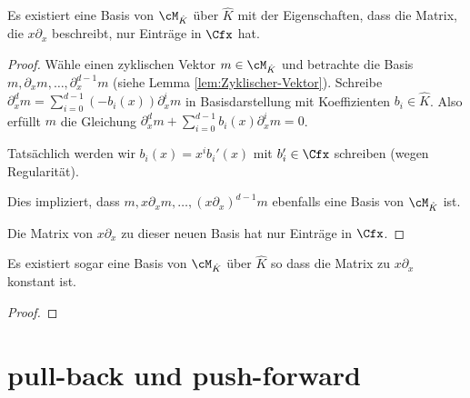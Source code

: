 \begin{lem}
\cite[Lem 5.2.1.]{sabbah_cimpa90}
Es existiert eine Basis von $\cM_{\hat K}$ über $\hat K$ mit der Eigenschaften,
dass die Matrix, die $x\partial_x$ beschreibt, nur Einträge in $\Cfx$ hat.
\end{lem}
\begin{proof}
Wähle einen zyklischen Vektor $m\in\cM_{\hat K}$ %
 und betrachte die Basis $m,\partial_x m,\dots,\partial_x^{d-1}m$ (siehe Lemma
\ref{lem:Zyklischer-Vektor}).
Schreibe $\partial_x^dm=\sum_{i=0}^{d-1}(-b_i(x))\partial_x^im$ in
Basisdarstellung mit Koeffizienten $b_i\in\hat K$.
Also erfüllt $m$ die Gleichung
$\partial_x^dm+\sum_{i=0}^{d-1}b_i(x)\partial_x^im=0$.

\begin{comment} bis hier schon klar \end{comment}


Tatsächlich werden wir $b_i(x)=x^ib_i'(x)$ mit $b_i'\in \Cfx$ schreiben (wegen
Regularität).

Dies impliziert, dass $m,x\partial_xm,\dots,(x\partial_x)^{d-1}m$ ebenfalls
eine Basis von $\cM_{\hat K}$ ist.

Die Matrix von $x\partial_x$ zu dieser neuen Basis hat nur Einträge in $\Cfx$.
\end{proof}
\begin{lem}
\cite[Lem 5.2.2.]{sabbah_cimpa90}
Es existiert sogar eine Basis von $\cM_{\hat K}$ über $\hat K$ so dass die
Matrix zu $x\partial_x$ konstant ist.
\end{lem}
\begin{proof}

\end{proof}
\section{pull-back und push-forward}
\begin{comment}
\cite[1.3]{hotta2007d}
\end{comment}

